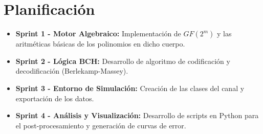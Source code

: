 \section{Planificación}
\begin{itemize}
    \item \textbf{Sprint 1 - Motor Algebraico:} Implementación de $GF(2^m)$ y las aritméticas básicas de los polinomios en dicho cuerpo.
    \item \textbf{Sprint 2 - Lógica BCH:} Desarrollo de algoritmo de codificación y decodificación (Berlekamp-Massey).
    \item \textbf{Sprint 3 - Entorno de Simulación:} Creación de las clases del canal y exportación de los datos.
    \item \textbf{Sprint 4 - Análisis y Visualización:} Desarrollo de scripts en Python para el post-procesamiento y generación de curvas de error.
\end{itemize}
